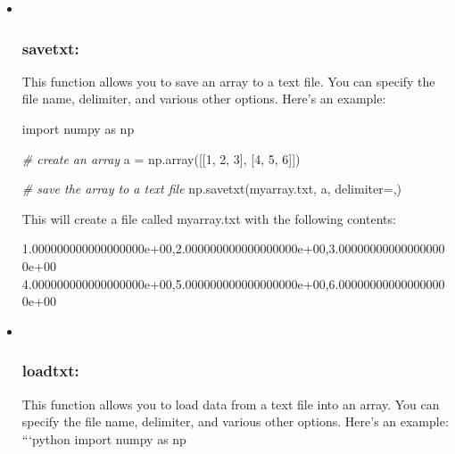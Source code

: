 \documentclass[11pt]{article}
\newenvironment{Shaded}{}{}
\newcommand{\DecValTok}[1]{\textcolor[rgb]{0.25,0.63,0.44}{{#1}}}
\newcommand{\FloatTok}[1]{\textcolor[rgb]{0.25,0.63,0.44}{{#1}}}
\newcommand{\StringTok}[1]{\textcolor[rgb]{0.25,0.44,0.63}{{#1}}}
\newcommand{\CommentTok}[1]{\textcolor[rgb]{0.38,0.63,0.69}{\textit{{#1}}}}
\newcommand{\NormalTok}[1]{{#1}}
\newcommand{\ImportTok}[1]{{#1}}
\newcommand{\OperatorTok}[1]{\textcolor[rgb]{0.40,0.40,0.40}{{#1}}}
\begin{document}
\begin{itemize}
\item ~
  \hypertarget{savetxt}{%
  \subsubsection{savetxt:}\label{savetxt}}

  This function allows you to save an array to a text file. You can
  specify the file name, delimiter, and various other options. Here's an
  example:

\begin{Shaded}
\begin{Highlighting}[]
\ImportTok{import}\NormalTok{ numpy }\ImportTok{as}\NormalTok{ np}

\CommentTok{\# create an array}
\NormalTok{a }\OperatorTok{=}\NormalTok{ np.array([[}\DecValTok{1}\NormalTok{, }\DecValTok{2}\NormalTok{, }\DecValTok{3}\NormalTok{], [}\DecValTok{4}\NormalTok{, }\DecValTok{5}\NormalTok{, }\DecValTok{6}\NormalTok{]])}

\CommentTok{\# save the array to a text file}
\NormalTok{np.savetxt(}\StringTok{\textquotesingle{}myarray.txt\textquotesingle{}}\NormalTok{, a, delimiter}\OperatorTok{=}\StringTok{\textquotesingle{},\textquotesingle{}}\NormalTok{)}
\end{Highlighting}
\end{Shaded}

  This will create a file called myarray.txt with the following
  contents:

\begin{Shaded}
\begin{Highlighting}[]
\FloatTok{1.000000000000000000e+00}\NormalTok{,}\FloatTok{2.000000000000000000e+00}\NormalTok{,}\FloatTok{3.000000000000000000e+00}
\FloatTok{4.000000000000000000e+00}\NormalTok{,}\FloatTok{5.000000000000000000e+00}\NormalTok{,}\FloatTok{6.000000000000000000e+00}
\end{Highlighting}
\end{Shaded}
\item ~
  \hypertarget{loadtxt}{%
  \subsubsection{loadtxt:}\label{loadtxt}}

  This function allows you to load data from a text file into an array.
  You can specify the file name, delimiter, and various other options.
  Here's an example: ```python import numpy as np


\end{itemize}
\end{document}
